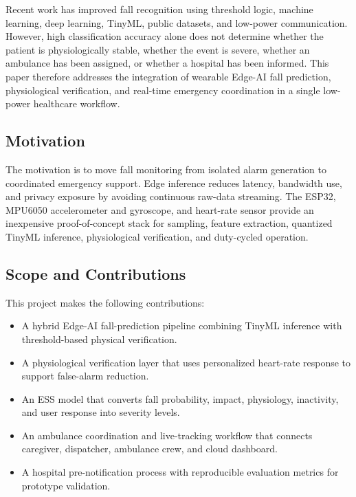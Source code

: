 Recent work has improved fall recognition using threshold logic, machine learning, deep learning, TinyML, public datasets, and low-power communication. However, high classification accuracy alone does not determine whether the patient is physiologically stable, whether the event is severe, whether an ambulance has been assigned, or whether a hospital has been informed. This paper therefore addresses the integration of wearable Edge-AI fall prediction, physiological verification, and real-time emergency coordination in a single low-power healthcare workflow.

\subsection{Motivation}
The motivation is to move fall monitoring from isolated alarm generation to coordinated emergency support. Edge inference reduces latency, bandwidth use, and privacy exposure by avoiding continuous raw-data streaming. The ESP32, MPU6050 accelerometer and gyroscope, and heart-rate sensor provide an inexpensive proof-of-concept stack for sampling, feature extraction, quantized TinyML inference, physiological verification, and duty-cycled operation.

\subsection{Scope and Contributions}
This project makes the following contributions:
\begin{itemize}
\item A hybrid Edge-AI fall-prediction pipeline combining TinyML inference with threshold-based physical verification.
\item A physiological verification layer that uses personalized heart-rate response to support false-alarm reduction.
\item An ESS model that converts fall probability, impact, physiology, inactivity, and user response into severity levels.
\item An ambulance coordination and live-tracking workflow that connects caregiver, dispatcher, ambulance crew, and cloud dashboard.
\item A hospital pre-notification process with reproducible evaluation metrics for prototype validation.
\end{itemize}